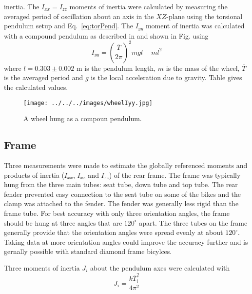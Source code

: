 \documentclass{bmd2010p}
\begin{document}
inertia. The $I_{xx}=I_{zz}$ moments of inertia were calculated by measuring
the averaged period of oscillation about an axis in the $XZ$-plane using the
torsional pendulum setup and Eq.~\ref{eq:torPend}. The $I_{yy}$ moment of
inertia was calculated with a compound pendulum as described in
\cite{Kooijman2006} and shown in Fig. using
\begin{equation}
	I_{yy}=\left(\frac{\overline{T}}{2\pi}\right)^2mgl-ml^2
\label{eq:comPend}
\end{equation}
where $l=0.303\pm0.002$ m is the pendulum length, $m$ is the mass of the wheel,
$\overline{T}$ is the averaged period and $g$ is the local acceleration due to
gravity. Table  gives the calculated values.
\begin{figure}[htpb]
    \begin{center}
        \texttt{[image: ../../../images/wheelIyy.jpg]}
    \end{center}
    \caption{A wheel hung as a compoun pendulum.}
    \label{fig:wheelIyy}
\end{figure}
\subsection{Frame}
Three measurements were made to estimate the globally referenced moments and
products of inertia ($I_{xx}$, $I_{xz}$ and $I_{zz}$) of the rear frame. The
frame was typically hung from the three main tubes: seat tube, down tube
and top tube. The rear fender prevented easy connection to the seat tube on
some of the bikes and the clamp was attached to the fender. The fender was
generally less rigid than the frame tube. For best accuracy with only three orientation angles, the frame
should be hung at three angles that are $120^\circ$ apart. The three tubes on
the frame generally provide that the orientation angles were spread evenly at
about $120^\circ$. Taking data at more orientation angles could improve the accuracy further and
is gernally possible with standard diamond frame bicylces.

Three moments of inertia $J_{i}$ about the pendulum axes were calculated with
\begin{equation}
	J_i=\frac{k\overline{T}_i^2}{4\pi^2}
\label{eq:torPend}
\end{equation}
\end{document}
